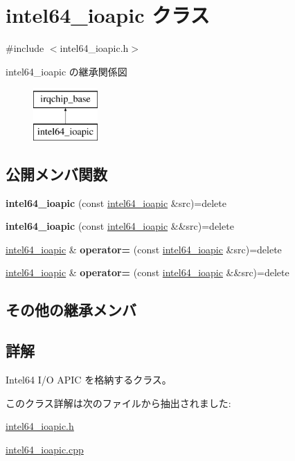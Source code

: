 \hypertarget{classintel64__ioapic}{}\section{intel64\+\_\+ioapic クラス}
\label{classintel64__ioapic}


{\ttfamily \#include $<$intel64\+\_\+ioapic.\+h$>$}

intel64\+\_\+ioapic の継承関係図\begin{figure}[H]
\begin{center}
\leavevmode
\includegraphics[height=2.000000cm]{classintel64__ioapic}
\end{center}
\end{figure}
\subsection*{公開メンバ関数}
\begin{DoxyCompactItemize}
\item 
\hypertarget{classintel64__ioapic_a2922ee7f84429f41538e711363c1d01b}{}{\bfseries intel64\+\_\+ioapic} (const \hyperlink{classintel64__ioapic}{intel64\+\_\+ioapic} \&src)=delete\label{classintel64__ioapic_a2922ee7f84429f41538e711363c1d01b}

\item 
\hypertarget{classintel64__ioapic_a69d45f8e24865e3460f55876a09018f1}{}{\bfseries intel64\+\_\+ioapic} (const \hyperlink{classintel64__ioapic}{intel64\+\_\+ioapic} \&\&src)=delete\label{classintel64__ioapic_a69d45f8e24865e3460f55876a09018f1}

\item 
\hypertarget{classintel64__ioapic_a503e60731936974a4260a78a5a6766a1}{}\hyperlink{classintel64__ioapic}{intel64\+\_\+ioapic} \& {\bfseries operator=} (const \hyperlink{classintel64__ioapic}{intel64\+\_\+ioapic} \&src)=delete\label{classintel64__ioapic_a503e60731936974a4260a78a5a6766a1}

\item 
\hypertarget{classintel64__ioapic_a3e11addf56fa011cefc5aa504b18585c}{}\hyperlink{classintel64__ioapic}{intel64\+\_\+ioapic} \& {\bfseries operator=} (const \hyperlink{classintel64__ioapic}{intel64\+\_\+ioapic} \&\&src)=delete\label{classintel64__ioapic_a3e11addf56fa011cefc5aa504b18585c}

\end{DoxyCompactItemize}
\subsection*{その他の継承メンバ}


\subsection{詳解}
Intel64 I/\+O A\+P\+I\+C を格納するクラス。 

このクラス詳解は次のファイルから抽出されました\+:\begin{DoxyCompactItemize}
\item 
\hyperlink{intel64__ioapic_8h}{intel64\+\_\+ioapic.\+h}\item 
\hyperlink{intel64__ioapic_8cpp}{intel64\+\_\+ioapic.\+cpp}\end{DoxyCompactItemize}
